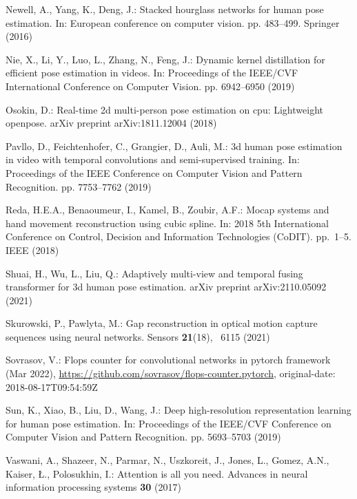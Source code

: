 \documentclass[runningheads]{llncs}
\begin{document}
\begin{thebibliography}{10}
Newell, A., Yang, K., Deng, J.: Stacked hourglass networks for human pose
  estimation. In: European conference on computer vision. pp. 483--499.
  Springer (2016)

Nie, X., Li, Y., Luo, L., Zhang, N., Feng, J.: Dynamic kernel distillation for
  efficient pose estimation in videos. In: Proceedings of the IEEE/CVF
  International Conference on Computer Vision. pp. 6942--6950 (2019)

Osokin, D.: Real-time 2d multi-person pose estimation on cpu: Lightweight
  openpose. arXiv preprint arXiv:1811.12004  (2018)

Pavllo, D., Feichtenhofer, C., Grangier, D., Auli, M.: 3d human pose estimation
  in video with temporal convolutions and semi-supervised training. In:
  Proceedings of the IEEE Conference on Computer Vision and Pattern
  Recognition. pp. 7753--7762 (2019)

Reda, H.E.A., Benaoumeur, I., Kamel, B., Zoubir, A.F.: Mocap systems and hand
  movement reconstruction using cubic spline. In: 2018 5th International
  Conference on Control, Decision and Information Technologies (CoDIT).
  pp.~1--5. IEEE (2018)

Shuai, H., Wu, L., Liu, Q.: Adaptively multi-view and temporal fusing
  transformer for 3d human pose estimation. arXiv preprint arXiv:2110.05092
  (2021)

Skurowski, P., Pawlyta, M.: Gap reconstruction in optical motion capture
  sequences using neural networks. Sensors  \textbf{21}(18), ~6115 (2021)

Sovrasov, V.: Flops counter for convolutional networks in pytorch framework
  (Mar 2022), \url{https://github.com/sovrasov/flops-counter.pytorch},
  original-date: 2018-08-17T09:54:59Z

Sun, K., Xiao, B., Liu, D., Wang, J.: Deep high-resolution representation
  learning for human pose estimation. In: Proceedings of the IEEE/CVF
  Conference on Computer Vision and Pattern Recognition. pp. 5693--5703 (2019)

Vaswani, A., Shazeer, N., Parmar, N., Uszkoreit, J., Jones, L., Gomez, A.N.,
  Kaiser, {\L}., Polosukhin, I.: Attention is all you need. Advances in neural
  information processing systems  \textbf{30} (2017)


\end{thebibliography}
\end{document}
